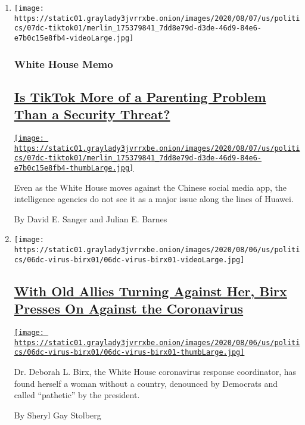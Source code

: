 \begin{enumerate}
\def\labelenumi{\arabic{enumi}.}
\item
  \texttt{[image: https://static01.graylady3jvrrxbe.onion/images/2020/08/07/us/politics/07dc-tiktok01/merlin\_175379841\_7dd8e79d-d3de-46d9-84e6-e7b0c15e8fb4-videoLarge.jpg]}

  \hypertarget{white-house-memo}{%
  \subsubsection{White House Memo}\label{white-house-memo}}

  \hypertarget{is-tiktok-more-of-a-parenting-problem-than-a-security-threat}{%
  \subsection{\texorpdfstring{\href{/2020/08/07/us/politics/tiktok-security-threat.html}{Is
  TikTok More of a Parenting Problem Than a Security
  Threat?}}{Is TikTok More of a Parenting Problem Than a Security Threat?}}\label{is-tiktok-more-of-a-parenting-problem-than-a-security-threat}}

  \href{/2020/08/07/us/politics/tiktok-security-threat.html}{\texttt{[image: https://static01.graylady3jvrrxbe.onion/images/2020/08/07/us/politics/07dc-tiktok01/merlin\_175379841\_7dd8e79d-d3de-46d9-84e6-e7b0c15e8fb4-thumbLarge.jpg]}}

  Even as the White House moves against the Chinese social media app,
  the intelligence agencies do not see it as a major issue along the
  lines of Huawei.

  By David E. Sanger and Julian E. Barnes
\item
  \texttt{[image: https://static01.graylady3jvrrxbe.onion/images/2020/08/06/us/politics/06dc-virus-birx01/06dc-virus-birx01-videoLarge.jpg]}

  \hypertarget{with-old-allies-turning-against-her-birx-presses-on-against-the-coronavirus}{%
  \subsection{\texorpdfstring{\href{/2020/08/06/us/politics/birx-coronavirus.html}{With
  Old Allies Turning Against Her, Birx Presses On Against the
  Coronavirus}}{With Old Allies Turning Against Her, Birx Presses On Against the Coronavirus}}\label{with-old-allies-turning-against-her-birx-presses-on-against-the-coronavirus}}

  \href{/2020/08/06/us/politics/birx-coronavirus.html}{\texttt{[image: https://static01.graylady3jvrrxbe.onion/images/2020/08/06/us/politics/06dc-virus-birx01/06dc-virus-birx01-thumbLarge.jpg]}}

  Dr. Deborah L. Birx, the White House coronavirus response coordinator,
  has found herself a woman without a country, denounced by Democrats
  and called ``pathetic'' by the president.

  By Sheryl Gay Stolberg
\end{enumerate}

